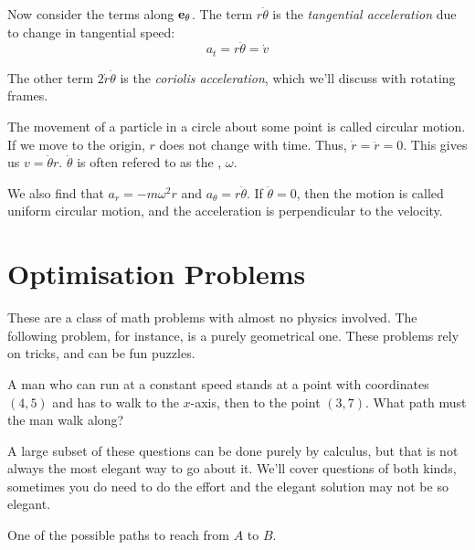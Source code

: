     Now consider the terms along $\mathbf{\boldsymbol{e}}_{\theta}$. The term 
    $r \ddot{\theta}$ is the \textit{tangential acceleration} due 
    to change in tangential speed:
    \[
    a_t = r \ddot{\theta} = \dot{v}
    \]

    The other term $2 \dot{r} \dot{\theta}$ is the 
    \textit{coriolis acceleration}, which we’ll discuss with 
    rotating frames.

    \begin{example}
        The movement of a particle in a circle about some point is called circular motion. If we move to the 
        origin, $r$ does not change with time. Thus, $\dot{r} = \ddot{r} = 0$. This gives us $v = \dot{\theta}r$. 
        $\dot{\theta}$ is often refered to as the , $\omega$. 
        
        We also find that
        $a_r = -m\omega^2r$ and $a_\theta = r\ddot{\theta}$. If $\ddot{\theta} = 0$, then the motion is called 
        uniform circular motion, and the acceleration is perpendicular to the velocity.   
    \end{example}

\section{Optimisation Problems}
    These are a class of math problems with almost no physics involved. The following problem, for instance, is a purely
    geometrical one. These problems rely on tricks, and can be fun puzzles.
    \begin{question}
        A man who can run at a constant speed stands at a point with coordinates $(4, 5)$ and has to walk to the $x$-axis, then to the point $(3, 7)$. What path must the man walk along?
    \end{question}

    A large subset of these questions can be done purely by calculus, but that is not always the most elegant way to go 
    about it. We'll cover questions of both kinds, sometimes you do need to do the effort and the elegant solution
    may not be so elegant.
    
    \begin{marginfigure}
        \vspace*{19em}
        \hspace*{-1.5em}
        \caption{One of the possible paths to reach from $A$ to $B$.} 
    \end{marginfigure}

